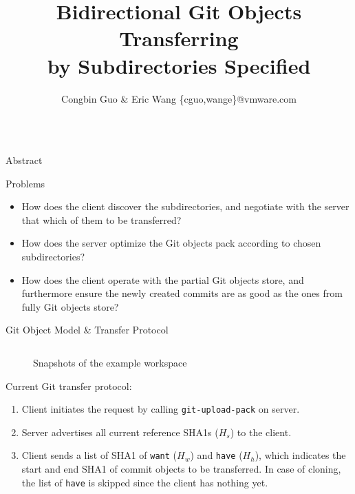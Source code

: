 \documentclass[final]{beamer}
\title{Bidirectional Git Objects Transferring\\ by Subdirectories Specified}
\author{Congbin Guo \& Eric Wang \{cguo,wange\}@vmware.com}
\institute{VMware Inc.}
\begin{document}
\begin{frame}[t, fragile]
  \begin{columns}[t]
    \begin{column}{.5\linewidth}
      \begin{block}{Abstract}
        
      \end{block}
      \begin{block}{Problems}
\begin{itemize}
    \justifying
  \item How does the client discover the subdirectories, and negotiate with
      the server that which of them to be transferred?

  \item How does the server optimize the Git objects pack according to chosen
      subdirectories?

  \item How does the client operate with the partial Git objects store, and
      furthermore ensure the newly created commits are as good as the ones
      from fully Git objects store?
\end{itemize}
      \end{block}
      \begin{block}{Git Object Model \& Transfer Protocol}
        \begin{columns}[T]
          \begin{column}{.5\textwidth}
              \begin{figure}\centering
                \caption{Snapshots of the example workspace}
                \label{fig:workspace}
              \end{figure}
            Current Git transfer protocol:
\begin{enumerate}
    \justifying
  \item Client initiates the request by calling \verb|git-upload-pack| on
    server.

  \item Server advertises all current reference SHA1s ($H_s$) to the client.

  \item Client sends a list of SHA1 of \verb|want| ($H_w$) and \verb|have|
    ($H_h$), which indicates the start and end SHA1 of commit objects to be
    transferred.
    In case of cloning, the list of \verb|have| is skipped since the client has
    nothing yet.


\end{enumerate}
\end{column}
\end{columns}
\end{block}
\end{column}
\end{columns}
\end{frame}
\end{document}
